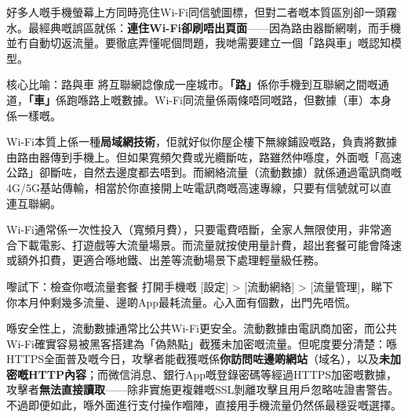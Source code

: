 


好多人嘅手機螢幕上方同時亮住Wi-Fi同信號圖標，但對二者嘅本質區別卻一頭霧水。最經典嘅誤區就係：\textbf{連住Wi-Fi卻刷唔出頁面}——因為路由器斷網喇，而手機並冇自動切返流量。要徹底弄懂呢個問題，我哋需要建立一個「路與車」嘅認知模型。

\begin{tcbinfo}{核心比喻：路與車}
將互聯網諗像成一座城市。\textbf{「路」}係你手機到互聯網之間嘅通道，\textbf{「車」}係跑喺路上嘅數據。Wi-Fi同流量係兩條唔同嘅路，但數據（車）本身係一樣嘅。

\end{tcbinfo}


Wi-Fi本質上係一種\textbf{局域網技術}，佢就好似你屋企樓下無線鋪設嘅路，負責將數據由路由器傳到手機上。但如果寬頻欠費或光纜斷咗，路雖然仲喺度，外面嘅「高速公路」卻斷咗，自然去邊度都去唔到。而網絡流量（流動數據）就係通過電訊商嘅4G/5G基站傳輸，相當於你直接開上咗電訊商嘅高速專線，只要有信號就可以直連互聯網。


Wi-Fi通常係一次性投入（寬頻月費），只要電費唔斷，全家人無限使用，非常適合下載電影、打遊戲等大流量場景。而流量就按使用量計費，超出套餐可能會降速或額外扣費，更適合喺地鐵、出差等流動場景下處理輕量級任務。

\begin{tcbpractice}{嚟試下：檢查你嘅流量套餐}
打開手機嘅 [設定] > [流動網絡] > [流量管理]，睇下你本月仲剩幾多流量、邊啲App最耗流量。心入面有個數，出門先唔慌。

\end{tcbpractice}


喺安全性上，流動數據通常比公共Wi-Fi更安全。流動數據由電訊商加密，而公共Wi-Fi確實容易被黑客搭建為「偽熱點」截獲未加密嘅流量。但呢度要分清楚：喺HTTPS全面普及嘅今日，攻擊者能截獲嘅係\textbf{你訪問咗邊啲網站}（域名），以及\textbf{未加密嘅HTTP內容}；而微信消息、銀行App嘅登錄密碼等經過HTTPS加密嘅數據，攻擊者\textbf{無法直接讀取}——除非實施更複雜嘅SSL剝離攻擊且用戶忽略咗證書警告。不過即便如此，喺外面進行支付操作嗰陣，直接用手機流量仍然係最穩妥嘅選擇。

